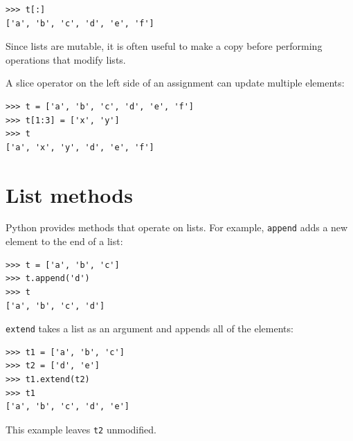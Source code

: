 \documentclass[10pt]{book}
\begin{document}
\begin{verbatim}
>>> t[:]
['a', 'b', 'c', 'd', 'e', 'f']
\end{verbatim}
%
Since lists are mutable, it is often useful to make a copy
before performing operations that modify lists.

A slice operator on the left side of an assignment
can update multiple elements:

\begin{verbatim}
>>> t = ['a', 'b', 'c', 'd', 'e', 'f']
>>> t[1:3] = ['x', 'y']
>>> t
['a', 'x', 'y', 'd', 'e', 'f']
\end{verbatim}
%


%

%


\section{List methods}

Python provides methods that operate on lists.  For example,
{\tt append} adds a new element to the end of a list:

\begin{verbatim}
>>> t = ['a', 'b', 'c']
>>> t.append('d')
>>> t
['a', 'b', 'c', 'd']
\end{verbatim}
%
{\tt extend} takes a list as an argument and appends all of
the elements:

\begin{verbatim}
>>> t1 = ['a', 'b', 'c']
>>> t2 = ['d', 'e']
>>> t1.extend(t2)
>>> t1
['a', 'b', 'c', 'd', 'e']
\end{verbatim}
%
This example leaves {\tt t2} unmodified.
\end{document}
